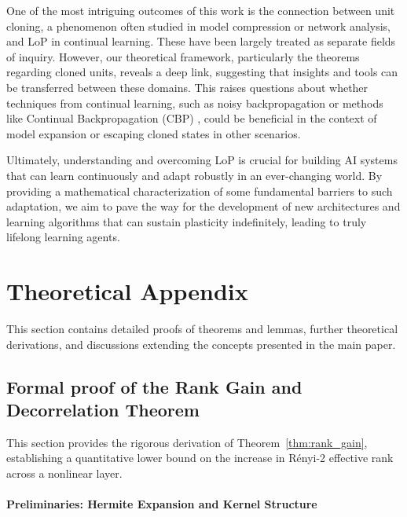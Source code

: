 \documentclass{article}
\numberwithin{figure}{section}
\begin{document}
One of the most intriguing outcomes of this work is the connection between unit cloning, a phenomenon often studied in model compression or network analysis, and LoP in continual learning. These have been largely treated as separate fields of inquiry. However, our theoretical framework, particularly the theorems regarding cloned units, reveals a deep link, suggesting that insights and tools can be transferred between these domains. This raises questions about whether techniques from continual learning, such as noisy backpropagation or methods like Continual Backpropagation (CBP) \citep{dohare2024loss}, could be beneficial in the context of model expansion or escaping cloned states in other scenarios.

Ultimately, understanding and overcoming LoP is crucial for building AI systems that can learn continuously and adapt robustly in an ever-changing world. By providing a mathematical characterization of some fundamental barriers to such adaptation, we aim to pave the way for the development of new architectures and learning algorithms that can sustain plasticity indefinitely, leading to truly lifelong learning agents.



\newpage 
\appendix

\appendix

\section{Theoretical Appendix}
\label{app:theory_appendix}
This section contains detailed proofs of theorems and lemmas, further theoretical derivations, and discussions extending the concepts presented in the main paper. 


\subsection{Formal proof of the Rank Gain and Decorrelation Theorem}
\label{app:rank_gain_proof}

This section provides the rigorous derivation of Theorem~\ref{thm:rank_gain}, establishing a quantitative lower bound on the increase in Rényi-2 effective rank across a nonlinear layer.

\paragraph{Preliminaries: Hermite Expansion and Kernel Structure}
\end{document}
